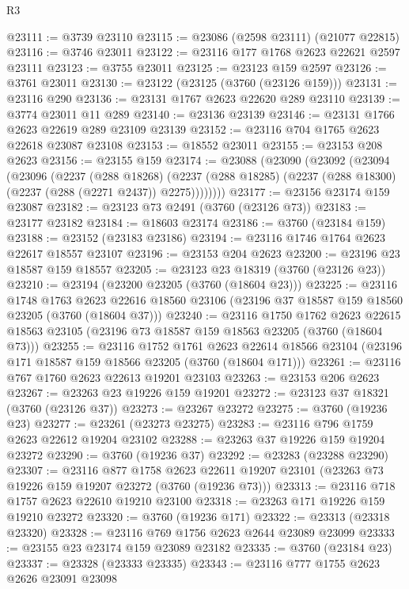 \begin{lexlean}{R3}
\begin{coremodule}
@23111 := @3739 @23110
@23115 := @23086 (@2598 @23111) (@21077 @22815)
@23116 := @3746 @23011
@23122 := @23116 @177 @1768 @2623 @22621 @2597 @23111
@23123 := @3755 @23011
@23125 := @23123 @159 @2597
@23126 := @3761 @23011
@23130 := @23122 (@23125 (@3760 (@23126 @159)))
@23131 := @23116 @290
@23136 := @23131 @1767 @2623 @22620 @289 @23110
@23139 := @3774 @23011 @11 @289
@23140 := @23136 @23139
@23146 := @23131 @1766 @2623 @22619 @289 @23109 @23139
@23152 := @23116 @704 @1765 @2623 @22618 @23087 @23108
@23153 := @18552 @23011
@23155 := @23153 @208 @2623
@23156 := @23155 @159
@23174 := @23088
    (@23090
      (@23092
        (@23094
          (@23096
            (@2237
              (@288 @18268)
              (@2237 (@288 @18285) (@2237 (@288 @18300) (@2237 (@288 (@2271 @2437)) @2275))))))))
@23177 := @23156 @23174 @159 @23087
@23182 := @23123 @73 @2491 (@3760 (@23126 @73))
@23183 := @23177 @23182
@23184 := @18603 @23174
@23186 := @3760 (@23184 @159)
@23188 := @23152 (@23183 @23186)
@23194 := @23116 @1746 @1764 @2623 @22617 @18557 @23107
@23196 := @23153 @204 @2623
@23200 := @23196 @23 @18587 @159 @18557
@23205 := @23123 @23 @18319 (@3760 (@23126 @23))
@23210 := @23194 (@23200 @23205 (@3760 (@18604 @23)))
@23225 := @23116
    @1748
    @1763
    @2623
    @22616
    @18560
    @23106
    (@23196 @37 @18587 @159 @18560 @23205 (@3760 (@18604 @37)))
@23240 := @23116
    @1750
    @1762
    @2623
    @22615
    @18563
    @23105
    (@23196 @73 @18587 @159 @18563 @23205 (@3760 (@18604 @73)))
@23255 := @23116
    @1752
    @1761
    @2623
    @22614
    @18566
    @23104
    (@23196 @171 @18587 @159 @18566 @23205 (@3760 (@18604 @171)))
@23261 := @23116 @767 @1760 @2623 @22613 @19201 @23103
@23263 := @23153 @206 @2623
@23267 := @23263 @23 @19226 @159 @19201
@23272 := @23123 @37 @18321 (@3760 (@23126 @37))
@23273 := @23267 @23272
@23275 := @3760 (@19236 @23)
@23277 := @23261 (@23273 @23275)
@23283 := @23116 @796 @1759 @2623 @22612 @19204 @23102
@23288 := @23263 @37 @19226 @159 @19204 @23272
@23290 := @3760 (@19236 @37)
@23292 := @23283 (@23288 @23290)
@23307 := @23116
    @877
    @1758
    @2623
    @22611
    @19207
    @23101
    (@23263 @73 @19226 @159 @19207 @23272 (@3760 (@19236 @73)))
@23313 := @23116 @718 @1757 @2623 @22610 @19210 @23100
@23318 := @23263 @171 @19226 @159 @19210 @23272
@23320 := @3760 (@19236 @171)
@23322 := @23313 (@23318 @23320)
@23328 := @23116 @769 @1756 @2623 @2644 @23089 @23099
@23333 := @23155 @23 @23174 @159 @23089 @23182
@23335 := @3760 (@23184 @23)
@23337 := @23328 (@23333 @23335)
@23343 := @23116 @777 @1755 @2623 @2626 @23091 @23098

\end{coremodule}
\end{lexlean}
